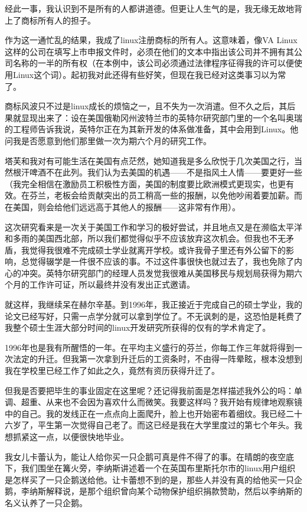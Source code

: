 经此一事，我认识到不是所有的人都讲道德。但更让人生气的是，我无缘无故地背上了商标所有人的担子。

作为这一通忙乱的结果，我成了linux注册商标的所有人。这意味着，像VA Linux这样的公司在填写上市申报文件时，必须在他们的文本中指出该公司并不拥有其公司名称的一半的所有权（在本例中，该公司必须通过法律程序征得我的许可以便使用Linux这个词）。起初我对此还得有些好笑，但现在我已经对这类事习以为常了。

商标风波只不过是linux成长的烦恼之一，且不失为一次消遣。但不久之后，其后果就显现出来了：设在美国俄勒冈州波特兰市的英特尔研究部门里的一个名叫奥瑞的工程师告诉我说，英特尔正在为其新开发的体系做准备，其中会用到Linux。他问我是否愿意到他们那里做一次为期六个月的研究工作。

塔芙和我对有可能生活在美国有点茫然，她知道我是多么欣悦于几次美国之行，当然根汗啤酒不在此列。我们认为去美国的机遇——不是指风土人情——要更好一些（我完全相信在激励员工积极性方面，美国的制度要比欧洲模式更现实，也更有效。在芬兰，老板会给贡献突出的员工稍高一些的报酬，以免他吵闹着要加薪。而在美国，则会给他们远远高于其他人的报酬——这非常有作用）。

这次研究看来是一次关于美国工作和学习的极好尝试，并且地点又是在濒临太平洋和多雨的美国西北部，所以我们都觉得似乎不应该放弃这次机会。但我也不无矛盾，我觉得我很难不完成硕士学业就离开学校。或许我骨子里还有外公留下的影响，总觉得辍学是一件很不应该的事。不过这件事很快也就过去了，我也免除了内心的冲突。英特尔研究部门的经理人员发觉我很难从美国移民与规划局获得为期六个月的工作许可证，所以最终并没有发出正式邀请。

就这样，我继续呆在赫尔辛基。到1996年，我正接近于完成自己的硕士学业，我的论文已经写好，只需一点学分就可以拿到学位了。不无讽刺的是，这恐怕是耗费了我整个硕士生涯大部分时间的linux开发研究所获得的仅有的学术肯定了。

1996年也是我有所醒悟的一年。在平均主义盛行的芬兰，你每工作三年就将得到一次法定的升迁。但我第一次拿到升迁后的工资条时，不由得一阵晕眩，根本没想到我在学校里已经工作了如此之久，竟然有资历获得升迁了。

但我是否要把毕生的事业固定在这里呢？还记得我前面是怎样描述我外公的吗：单调、超重、从来也不会因为喜欢什么而微笑。我要这样吗？我开始有规律地观察镜中的自己。我的发线正在一点点向上面爬升，脸上也开始密布着细纹。我已经二十六岁了，平生第一次觉得自己老了。而这已经是我在大学里度过的第七个年头。我想抓紧这一点，以便很快地毕业。

我女儿卡蕾认为，能让人给你买一只企鹅可真是件不得了的事。在晴朗的夜空底下，我们围坐在篝火旁，李纳斯讲述着一个在英国布里斯托尔市的linux用户组织是怎样买了一只企鹅送给他。让卡蕾想不到的是，那些人并没有真的给他买一只企鹅，李纳斯解释说，是那个组织曾向某个动物保护组织捐款赞助，然后以李纳斯的名义认养了一只企鹅。

